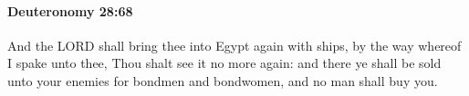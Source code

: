 
		\paragraph{Deuteronomy 28:68} %
			\label{DEUTERONOMY-28-68}

			And the LORD shall bring thee into Egypt again with ships, by the way whereof I spake unto thee, Thou shalt see it no more again: and there ye shall be sold unto your enemies for bondmen and bondwomen, and no man shall buy you.

